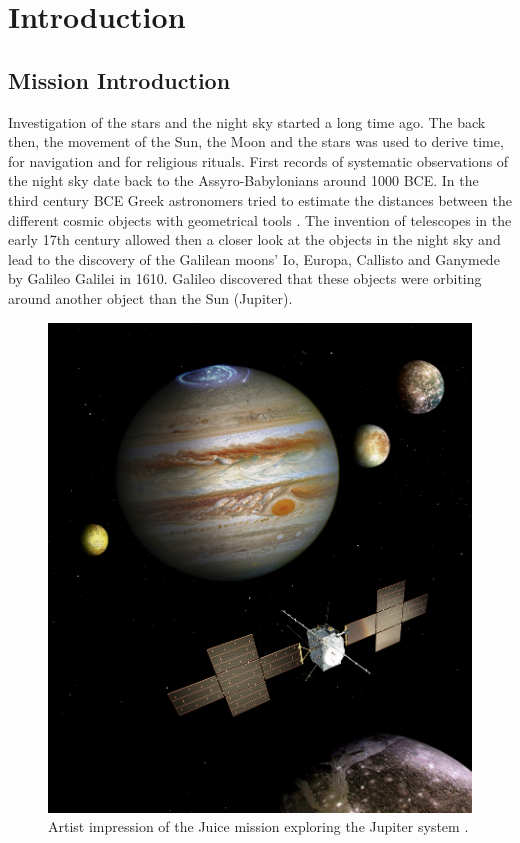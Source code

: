 \section{Introduction}
	
	\subsection{Mission Introduction} %
	
	Investigation of the stars and the night sky started a long time ago. The back then, the movement of the Sun, the Moon and the stars was used to derive time, for navigation and for religious rituals. First records of systematic observations of the night sky date back to the Assyro-Babylonians around 1000 BCE. In the third century BCE Greek astronomers tried to estimate the distances between the different cosmic objects with geometrical tools \cite{space_history}. The invention of telescopes in the early 17th century allowed then a closer look at the objects in the night sky and lead to the discovery of the Galilean moons' Io, Europa, Callisto and Ganymede by Galileo Galilei in 1610. Galileo discovered that these objects were orbiting around another object than the Sun (Jupiter).
	\begin{figure}
		\includegraphics[width=\linewidth]{Bilder/Juice_mission.jpg}
		\caption{Artist impression of the Juice mission exploring the Jupiter system \cite{JUICE_Pic}.}
		\label{fig:JUICE}
	\end{figure}
